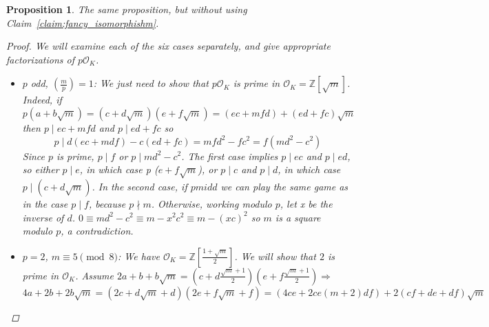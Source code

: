 \documentclass[11pt]{article}
\newtheorem{prop}{Proposition}
\theoremstyle{definition}
\begin{document}
    \begin{prop}
        The same proposition, but without using Claim~\ref{claim:fancy_isomorphishm}.
        \begin{proof}
            We will examine each of the six cases separately, and give appropriate factorizations of $p\mathcal{O}_K$.
            \begin{itemize}

                \item $p$ odd, $\left( \frac{m}{p} \right) = 1$: We just need to show that $p \mathcal{O}_K$ is prime in $\mathcal{O}_K = \mathbb{Z}\left[\sqrt {m}\right]$.
                Indeed, if \[p\left(a+b\sqrt {m}\right) = \left(c+d\sqrt{m}\right)\left(e+f\sqrt{m}\right) = (ec + mfd) + (ed + fc)\sqrt{m}\]
                then $p \mid ec + mfd$ and $p \mid ed + fc$ so
                \[p \mid d(ec+mdf) - c(ed+fc) = mfd^2 - fc^2 = f(md^2 - c^2)\]
                Since $p$ is prime, $p \mid f$ or $p \mid md^2 - c^2$.
                The first case implies $p \mid ec$ and $p \mid ed$, so either $p \mid e$,
                in which case p \mid ($e + f \sqrt {m}$), or $p \mid c$ and $p \mid d$,
                in which case $p \mid \left(c + d \sqrt {m}\right)$.
                In the second case, if $p mid d$ we can play the same game as in the case $p \mid f$, because $p \nmid m$.
                Otherwise, working modulo $p$, let x be the inverse of $d$.
                $0 \equiv md^2-c^2 \equiv m - x^2c^2 \equiv m - (xc)^2$ so $m$ is a square modulo $p$, a contradiction.

                \item $p=2$, $m \equiv 5 \pmod 8$: We have $\mathcal{O}_K = \mathbb{Z}\left[\frac{1+\sqrt {m}}{2}\right]$.
                We will show that $2$ is prime in $\mathcal{O}_K$.
                Assume $2a+b + b\sqrt {m} = (c+d\frac{\sqrt {m}+1}{2})(e+f\frac{\sqrt {m}+1}{2}) \Rightarrow$
                \[
                    4a + 2b + 2b\sqrt {m} = (2c+d\sqrt {m}+d)(2e+f\sqrt {m}+f) = (4ce + 2ce (m+2)df) + 2(cf+de+df)\sqrt {m}
                \]
            \end{itemize}
        \end{proof}
    \end{prop}
\end{document}
